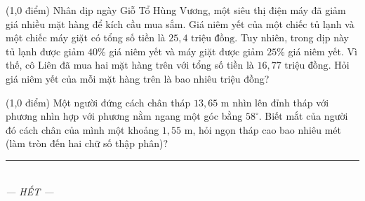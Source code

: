 \documentclass[12pt,a4paper]{article}
\begin{document}
\begin{ex} (1,0 điểm)
Nhân dịp ngày Giỗ Tổ Hùng Vương, một siêu thị điện máy đã giảm giá nhiều mặt hàng để kích cầu mua sắm. Giá niêm yết của một chiếc tủ lạnh và một chiếc máy giặt có tổng số tiền là $25{,}4\text{ triệu đồng}$. Tuy nhiên, trong dịp này tủ lạnh được giảm $40\%$ giá niêm yết và máy giặt được giảm $25\%$ giá niêm yết. Vì thế, cô Liên đã mua hai mặt hàng trên với tổng số tiền là $16{,}77\text{ triệu đồng}$. Hỏi giá niêm yết của mỗi mặt hàng trên là bao nhiêu triệu đồng?
\end{ex}
\vspace{0.5mm}

\begin{ex} (1,0 điểm)
Một người đứng cách chân tháp $13{,}65\text{ m}$ nhìn lên đỉnh tháp với phương nhìn hợp với phương nằm ngang một góc bằng $58^\circ$. Biết mắt của người đó cách chân của mình một khoảng $1{,}55\text{ m}$, hỏi ngọn tháp cao bao nhiêu mét (làm tròn đến hai chữ số thập phân)?
\begin{center}
\end{center}
\end{ex}
\vspace{0.5mm}


\enlargethispage{1.5cm}
\begin{center}
\rule{4cm}{0.4pt}\\
\textit{--- HẾT ---}
\end{center}
\end{document}
